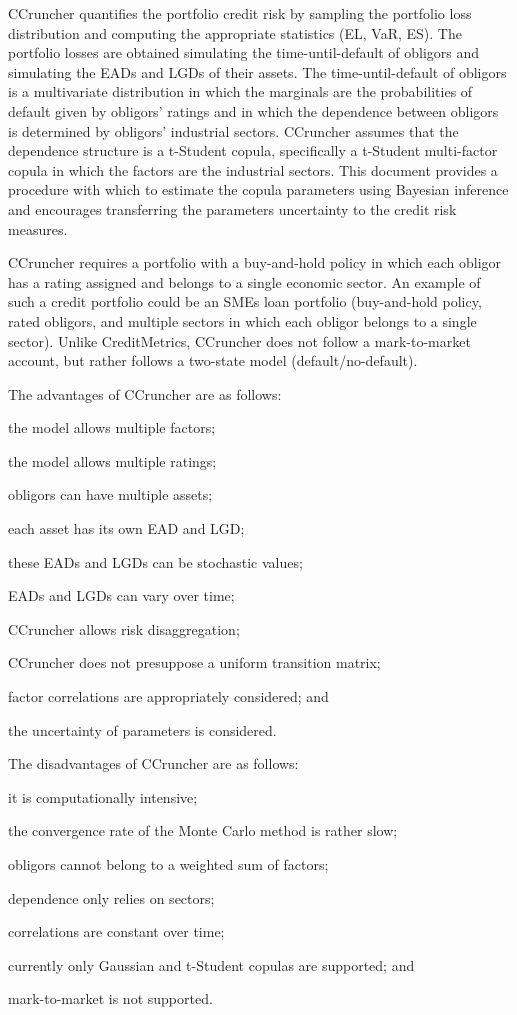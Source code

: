 \documentclass[11pt,fleqn]{book} %
\begin{document}
CCruncher quantifies the portfolio credit risk by sampling the portfolio loss
distribution and computing the appropriate statistics (EL, VaR, ES). The 
portfolio losses are obtained simulating the time-until-default of obligors 
and simulating the EADs and LGDs of their assets. The time-until-default of 
obligors is a multivariate distribution in which the marginals are the 
probabilities of default given by obligors' ratings and in which the dependence 
between obligors is determined by obligors' industrial sectors. CCruncher 
assumes that the dependence structure is a t-Student copula, specifically 
a t-Student multi-factor copula in which the factors are the industrial sectors.
This document provides a procedure with which to estimate the copula parameters 
using Bayesian inference and encourages transferring the parameters uncertainty
to the credit risk measures.

CCruncher requires a portfolio with a buy-and-hold policy in which each obligor 
has a rating assigned and belongs to a single economic sector. An example of 
such a credit portfolio could be an SMEs loan portfolio (buy-and-hold policy, 
rated obligors, and multiple sectors in which each obligor belongs to a single 
sector). Unlike CreditMetrics\texttrademark{}, CCruncher does not follow a 
mark-to-market account, but rather follows a two-state model (default/no-default). 

The advantages of CCruncher are as follows: 
\begin{inparaenum}[1)]
	\item the model allows multiple factors;
	\item the model allows multiple ratings;
	\item obligors can have multiple assets;
	\item each asset has its own EAD and LGD;
	\item these EADs and LGDs can be stochastic values;
	\item EADs and LGDs can vary over time; 
	\item CCruncher allows risk disaggregation;
	\item CCruncher does not presuppose a uniform transition matrix;
	\item factor correlations are appropriately considered; and
	\item the uncertainty of parameters is considered.
\end{inparaenum}

The disadvantages of CCruncher are as follows: 
\begin{inparaenum}[1)]
	\item it is computationally intensive;
	\item the convergence rate of the Monte Carlo method is rather slow;
	\item obligors cannot belong to a weighted sum of factors;
	\item dependence only relies on sectors;
	\item correlations are constant over time;
	\item currently only Gaussian and t-Student copulas are supported; and
	\item mark-to-market is not supported.
\end{inparaenum}
\end{document}
